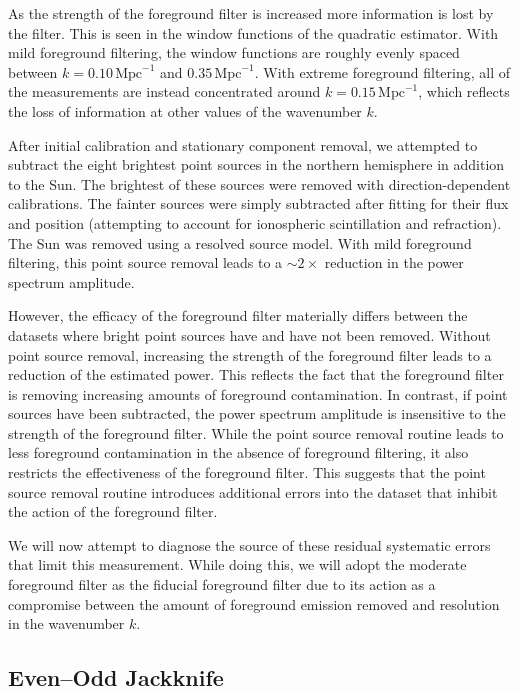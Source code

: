 \documentclass[twocolumn]{aastex62}
\begin{document}
As the strength of the foreground filter is increased more information is lost by the filter. This
is seen in the window functions of the quadratic estimator. With mild foreground filtering, the
window functions are roughly evenly spaced between $k=0.10\,\text{Mpc}^{-1}$ and
$0.35\,\text{Mpc}^{-1}$. With extreme foreground filtering, all of the measurements are instead
concentrated around $k=0.15\,\text{Mpc}^{-1}$, which reflects the loss of information at other
values of the wavenumber $k$.

After initial calibration and stationary component removal, we attempted to subtract the eight
brightest point sources in the northern hemisphere in addition to the Sun. The brightest of these
sources were removed with direction-dependent calibrations. The fainter sources were simply
subtracted after fitting for their flux and position (attempting to account for ionospheric
scintillation and refraction). The Sun was removed using a resolved source model. With mild
foreground filtering, this point source removal leads to a $\sim2\times$ reduction in the power
spectrum amplitude.

However, the efficacy of the foreground filter materially differs between the datasets where bright
point sources have and have not been removed. Without point source removal, increasing the strength
of the foreground filter leads to a reduction of the estimated power. This reflects the fact that
the foreground filter is removing increasing amounts of foreground contamination. In contrast, if
point sources have been subtracted, the power spectrum amplitude is insensitive to the strength of
the foreground filter. While the point source removal routine leads to less foreground contamination
in the absence of foreground filtering, it also restricts the effectiveness of the foreground
filter. This suggests that the point source removal routine introduces additional errors into the
dataset that inhibit the action of the foreground filter.

We will now attempt to diagnose the source of these residual systematic errors that limit this
measurement. While doing this, we will adopt the moderate foreground filter as the fiducial
foreground filter due to its action as a compromise between the amount of foreground emission
removed and resolution in the wavenumber $k$.

\subsection{Even--Odd Jackknife}
\end{document}
